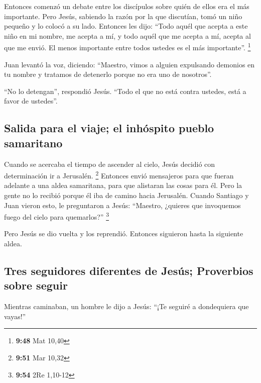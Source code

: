  Entonces comenzó un debate entre los discípulos sobre
quién de ellos era el más importante.  Pero Jesús,
sabiendo la razón por la que discutían, tomó un niño pequeño y lo colocó
a su lado.  Entonces les dijo: ``Todo aquél que acepta a
este niño en mi nombre, me acepta a mí, y todo aquél que me acepta a mí,
acepta al que me envió. El menos importante entre todos ustedes es el
más importante''. \footnote{\textbf{9:48} Mat 10,40}

 Juan levantó la voz, diciendo: ``Maestro, vimos a
alguien expulsando demonios en tu nombre y tratamos de detenerlo porque
no era uno de nosotros''.

 ``No lo detengan'', respondió Jesús. ``Todo el que no
está contra ustedes, está a favor de ustedes''.

\hypertarget{salida-para-el-viaje-el-inhuxf3spito-pueblo-samaritano}{%
\subsection{Salida para el viaje; el inhóspito pueblo
samaritano}\label{salida-para-el-viaje-el-inhuxf3spito-pueblo-samaritano}}

 Cuando se acercaba el tiempo de ascender al cielo, Jesús
decidió con determinación ir a Jerusalén. \footnote{\textbf{9:51} Mar
  10,32}  Entonces envió mensajeros para que fueran
adelante a una aldea samaritana, para que alistaran las cosas para él.
 Pero la gente no lo recibió porque él iba de camino
hacia Jerusalén.  Cuando Santiago y Juan vieron esto, le
preguntaron a Jesús: ``Maestro, ¿quieres que invoquemos fuego del cielo
para quemarlos?'' \footnote{\textbf{9:54} 2Re 1,10-12}

 Pero Jesús se dio vuelta y los reprendió.
 Entonces siguieron hasta la siguiente aldea.

\hypertarget{tres-seguidores-diferentes-de-jesuxfas-proverbios-sobre-seguir}{%
\subsection{Tres seguidores diferentes de Jesús; Proverbios sobre
seguir}\label{tres-seguidores-diferentes-de-jesuxfas-proverbios-sobre-seguir}}

 Mientras caminaban, un hombre le dijo a Jesús: ``¡Te
seguiré a dondequiera que vayas!''

